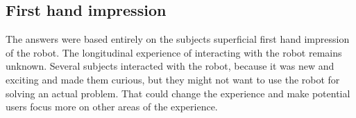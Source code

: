 \subsection{First hand impression}
The answers were based entirely on the subjects superficial first hand impression of the robot. The longitudinal experience of interacting with the robot remains unknown. Several subjects interacted with the robot, because it was new and exciting and made them curious, but they might not want to use the robot for solving an actual problem. That could change the experience and make potential users focus more on other areas of the experience.
